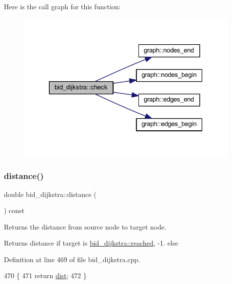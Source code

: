 Here is the call graph for this function\+:\nopagebreak
\begin{figure}[H]
\begin{center}
\leavevmode
\includegraphics[width=315pt]{classbid__dijkstra_a504aa04d114f27f2f886ee3b025ad95b_cgraph}
\end{center}
\end{figure}
\mbox{\label{classbid__dijkstra_a6150beb75d59f16d0332f42d5ff7e3f3}} 
\subsubsection{\texorpdfstring{distance()}{distance()}}
{\footnotesize\ttfamily double bid\+\_\+dijkstra\+::distance (\begin{DoxyParamCaption}{ }\end{DoxyParamCaption}) const}



Returns the distance from source node to target node. 

\begin{DoxyReturn}{Returns}
distance if target is \mbox{\hyperlink{classbid__dijkstra_a97f599b54fe9b030d87474898ff4a64c}{bid\+\_\+dijkstra\+::reached}}, {\ttfamily -\/1.} else 
\end{DoxyReturn}


Definition at line 469 of file bid\+\_\+dijkstra.\+cpp.


\begin{DoxyCode}
470 \{
471     \textcolor{keywordflow}{return} \mbox{\hyperlink{classbid__dijkstra_a10224bf2b56cb3fe20cef83592ecdc13}{dist}};
472 \}
\end{DoxyCode}
\mbox{\label{classbid__dijkstra_a279264a4cee9a4a8ad45ec957245e90a}} 
